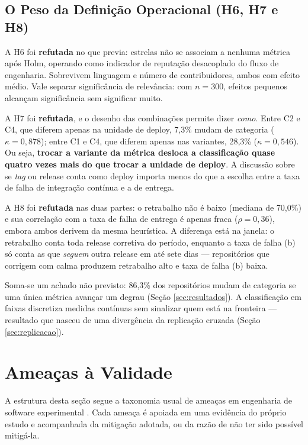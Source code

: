 \subsection{O Peso da Definição Operacional (H6, H7 e H8)}

A H6 foi \textbf{refutada} no que previa: estrelas não se associam a nenhuma métrica após
Holm, operando como indicador de reputação desacoplado do fluxo de engenharia. Sobrevivem
linguagem e número de contribuidores, ambos com efeito médio. Vale separar significância de
relevância: com $n = 300$, efeitos pequenos alcançam significância sem significar muito.

A H7 foi \textbf{refutada}, e o desenho das combinações permite dizer \emph{como}. Entre C2 e
C4, que diferem apenas na unidade de deploy, 7,3\% mudam de categoria
($\kappa = 0{,}878$); entre C1 e C4, que diferem apenas nas variantes, 28,3\%
($\kappa = 0{,}546$). Ou seja, \textbf{trocar a variante da métrica desloca a classificação
quase quatro vezes mais do que trocar a unidade de deploy}. A discussão sobre se \emph{tag} ou
release conta como deploy importa menos do que a escolha entre a taxa de falha de integração contínua e a de entrega.

A H8 foi \textbf{refutada} nas duas partes: o retrabalho não é baixo (mediana de 70,0\%) e sua
correlação com a taxa de falha de entrega é apenas fraca ($\rho = 0{,}36$), embora ambos derivem da
mesma heurística. A diferença está na janela: o retrabalho conta toda release corretiva do
período, enquanto a taxa de falha (b) só conta as que \emph{seguem} outra release em até sete dias ---
repositórios que corrigem com calma produzem retrabalho alto e taxa de falha (b) baixa.

Soma-se um achado não previsto: 86,3\% dos repositórios mudam de categoria se uma única
métrica avançar um degrau (Seção \ref{sec:resultados}). A classificação em faixas discretiza
medidas contínuas sem sinalizar quem está na fronteira --- resultado que nasceu de uma
divergência da replicação cruzada (Seção \ref{sec:replicacao}).

\section{Ameaças à Validade}
\label{sec:ameacas}

A estrutura desta seção segue a taxonomia usual de ameaças em engenharia de software
experimental \cite{wohlin2012}. Cada ameaça é apoiada em uma evidência do próprio estudo e
acompanhada da mitigação adotada, ou da razão de não ter sido possível mitigá-la.

